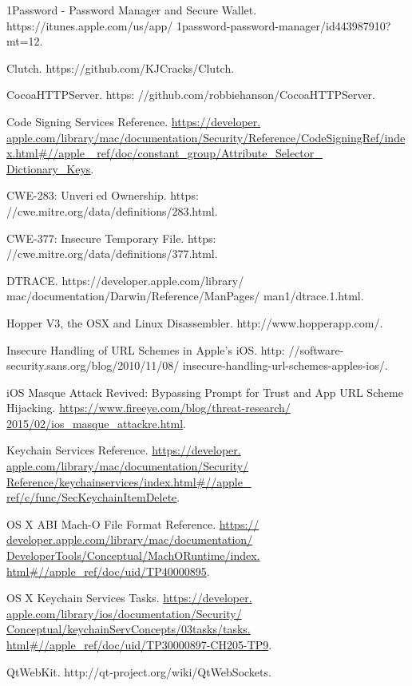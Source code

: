 \documentclass{article}
\begin{document}
\begin{thebibliography}{100}

1Password - Password Manager and Secure Wallet. 
https://itunes.apple.com/us/app/
1password-password-manager/id443987910?mt=12.

Clutch. https://github.com/KJCracks/Clutch.

CocoaHTTPServer. https:
//github.com/robbiehanson/CocoaHTTPServer.

Code Signing Services Reference. \url{https://developer.
apple.com/library/mac/documentation/Security/Reference/CodeSigningRef/index.html#//apple_
ref/doc/constant_group/Attribute_Selector_
Dictionary_Keys}.

CWE-283: Unveried Ownership. https:
//cwe.mitre.org/data/definitions/283.html.


CWE-377: Insecure Temporary File. https:
//cwe.mitre.org/data/definitions/377.html.

DTRACE. https://developer.apple.com/library/
mac/documentation/Darwin/Reference/ManPages/
man1/dtrace.1.html.

Hopper V3, the OSX and Linux Disassembler.
http://www.hopperapp.com/.

Insecure Handling of URL Schemes in Apple's iOS.
http:
//software-security.sans.org/blog/2010/11/08/
insecure-handling-url-schemes-apples-ios/.

 iOS Masque Attack Revived: Bypassing Prompt for
Trust and App URL Scheme Hijacking.
\url{https://www.fireeye.com/blog/threat-research/
2015/02/ios_masque_attackre.html}.

 Keychain Services Reference. \url{https://developer.
apple.com/library/mac/documentation/Security/
Reference/keychainservices/index.html#//apple_
ref/c/func/SecKeychainItemDelete}.

OS X ABI Mach-O File Format Reference. \url{https://
developer.apple.com/library/mac/documentation/
DeveloperTools/Conceptual/MachORuntime/index.
html#//apple_ref/doc/uid/TP40000895}.

OS X Keychain Services Tasks. \url{https://developer.
apple.com/library/ios/documentation/Security/
Conceptual/keychainServConcepts/03tasks/tasks.
html#//apple_ref/doc/uid/TP30000897-CH205-TP9}.

QtWebKit.
http://qt-project.org/wiki/QtWebSockets.


\end{thebibliography}
\end{document}
